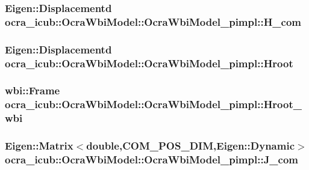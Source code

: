 \hypertarget{structOcraWbiModel_1_1OcraWbiModel__pimpl_a5e031088136b048a403c9df06e62c2b8}{
\subsubsection[{\-H\-\_\-com}]{\setlength{\rightskip}{0pt plus 5cm}\-Eigen\-::\-Displacementd {\bf ocra\-\_\-icub\-::\-Ocra\-Wbi\-Model\-::\-Ocra\-Wbi\-Model\-\_\-pimpl\-::\-H\-\_\-com}}}\label{structOcraWbiModel_1_1OcraWbiModel__pimpl_a5e031088136b048a403c9df06e62c2b8}
\hypertarget{structOcraWbiModel_1_1OcraWbiModel__pimpl_a123381dc5b78bd79aed493801e3e6b35}{
\subsubsection[{\-Hroot}]{\setlength{\rightskip}{0pt plus 5cm}\-Eigen\-::\-Displacementd {\bf ocra\-\_\-icub\-::\-Ocra\-Wbi\-Model\-::\-Ocra\-Wbi\-Model\-\_\-pimpl\-::\-Hroot}}}\label{structOcraWbiModel_1_1OcraWbiModel__pimpl_a123381dc5b78bd79aed493801e3e6b35}
\hypertarget{structOcraWbiModel_1_1OcraWbiModel__pimpl_a633b61e128305d5437d8e8c61ae63849}{
\subsubsection[{\-Hroot\-\_\-wbi}]{\setlength{\rightskip}{0pt plus 5cm}wbi\-::\-Frame {\bf ocra\-\_\-icub\-::\-Ocra\-Wbi\-Model\-::\-Ocra\-Wbi\-Model\-\_\-pimpl\-::\-Hroot\-\_\-wbi}}}\label{structOcraWbiModel_1_1OcraWbiModel__pimpl_a633b61e128305d5437d8e8c61ae63849}
\hypertarget{structOcraWbiModel_1_1OcraWbiModel__pimpl_ab724e92a7f74f03c3842f22129b2ad94}{
\subsubsection[{\-J\-\_\-com}]{\setlength{\rightskip}{0pt plus 5cm}\-Eigen\-::\-Matrix$<$double,{\bf \-C\-O\-M\-\_\-\-P\-O\-S\-\_\-\-D\-I\-M},\-Eigen\-::\-Dynamic$>$ {\bf ocra\-\_\-icub\-::\-Ocra\-Wbi\-Model\-::\-Ocra\-Wbi\-Model\-\_\-pimpl\-::\-J\-\_\-com}}}\label{structOcraWbiModel_1_1OcraWbiModel__pimpl_ab724e92a7f74f03c3842f22129b2ad94}
